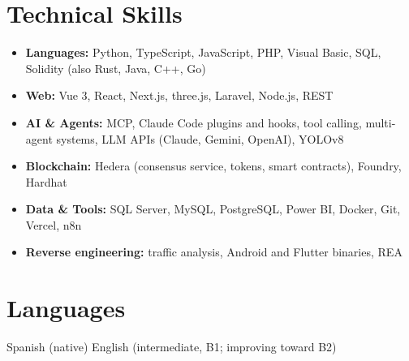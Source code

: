 \documentclass[a4paper,10pt]{article}
\begin{document}
\section*{Technical Skills}
\begin{itemize}
    \item \textbf{Languages:} Python, TypeScript, JavaScript, PHP, Visual Basic, SQL, Solidity
        (also Rust, Java, C++, Go)
    \item \textbf{Web:} Vue 3, React, Next.js, three.js, Laravel, Node.js, REST
    \item \textbf{AI \& Agents:} MCP, Claude Code plugins and hooks, tool calling, multi-agent
        systems, LLM APIs (Claude, Gemini, OpenAI), YOLOv8
    \item \textbf{Blockchain:} Hedera (consensus service, tokens, smart contracts), Foundry, Hardhat
    \item \textbf{Data \& Tools:} SQL Server, MySQL, PostgreSQL, Power BI, Docker, Git, Vercel, n8n
    \item \textbf{Reverse engineering:} traffic analysis, Android and Flutter binaries, REA
\end{itemize}

\section*{Languages}
Spanish (native) \textperiodcentered{} English (intermediate, B1; improving toward B2)
\end{document}
